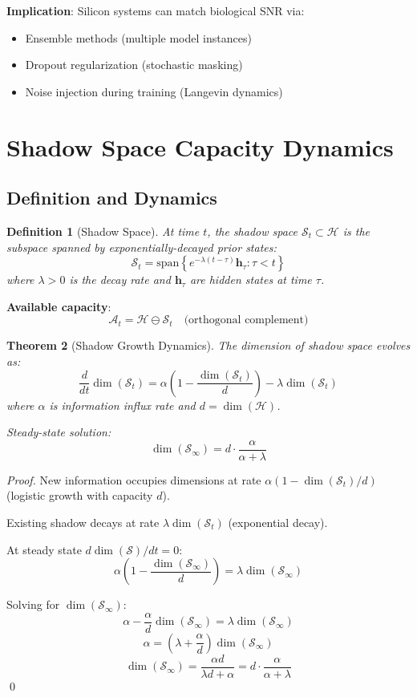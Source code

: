 \documentclass[11pt]{article}
\newtheorem{theorem}{Theorem}[section]
\newtheorem{definition}[theorem]{Definition}
\begin{document}
\textbf{Implication}: Silicon systems can match biological SNR via:
\begin{itemize}
\item Ensemble methods (multiple model instances)
\item Dropout regularization (stochastic masking)
\item Noise injection during training (Langevin dynamics)
\end{itemize}

\section{Shadow Space Capacity Dynamics}

\subsection{Definition and Dynamics}

\begin{definition}[Shadow Space]
At time $t$, the shadow space $\mathcal{S}_t \subset \mathcal{H}$ is the subspace spanned by exponentially-decayed prior states:
\[
\mathcal{S}_t = \text{span}\left\{e^{-\lambda(t-\tau)} \mathbf{h}_\tau : \tau < t\right\}
\]
where $\lambda > 0$ is the decay rate and $\mathbf{h}_\tau$ are hidden states at time $\tau$.
\end{definition}

\textbf{Available capacity}:
\[
\mathcal{A}_t = \mathcal{H} \ominus \mathcal{S}_t \quad \text{(orthogonal complement)}
\]

\begin{theorem}[Shadow Growth Dynamics]
The dimension of shadow space evolves as:
\[
\frac{d}{dt} \dim(\mathcal{S}_t) = \alpha \left(1 - \frac{\dim(\mathcal{S}_t)}{d}\right) - \lambda \dim(\mathcal{S}_t)
\]
where $\alpha$ is information influx rate and $d = \dim(\mathcal{H})$.

Steady-state solution:
\[
\dim(\mathcal{S}_\infty) = d \cdot \frac{\alpha}{\alpha + \lambda}
\]
\end{theorem}

\begin{proof}
New information occupies dimensions at rate $\alpha(1 - \dim(\mathcal{S}_t)/d)$ (logistic growth with capacity $d$).

Existing shadow decays at rate $\lambda \dim(\mathcal{S}_t)$ (exponential decay).

At steady state $d\dim(\mathcal{S})/dt = 0$:
\[
\alpha \left(1 - \frac{\dim(\mathcal{S}_\infty)}{d}\right) = \lambda \dim(\mathcal{S}_\infty)
\]

Solving for $\dim(\mathcal{S}_\infty)$:
\[
\alpha - \frac{\alpha}{d}\dim(\mathcal{S}_\infty) = \lambda \dim(\mathcal{S}_\infty)
\]
\[
\alpha = \left(\lambda + \frac{\alpha}{d}\right) \dim(\mathcal{S}_\infty)
\]
\[
\dim(\mathcal{S}_\infty) = \frac{\alpha d}{\lambda d + \alpha} = d \cdot \frac{\alpha}{\alpha + \lambda}
\]
\qed
\end{proof}
\end{document}
